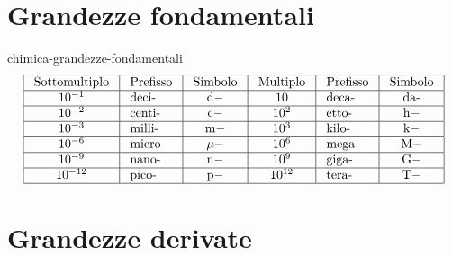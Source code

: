 \documentclass[preview]{standalone}
\begin{document}
\genpage

\section{Grandezze fondamentali}

\begin{snippet}{chimica-grandezze-fondamentali}
    \phantom{}$$
    \begin{array}{|c|l|c|c|l|c|}
    \hline \text { Sottomultiplo } & \text { Prefisso } & \text { Simbolo } & \text { Multiplo } & \text { Prefisso } & \text { Simbolo } \\
    \hline 10^{-1} & \text { deci- } & \mathrm{d}- & 10 & \text { deca- } & \text { da- } \\
    \hline 10^{-2} & \text { centi- } & \mathrm{c}- & 10^2 & \text { etto- } & \mathrm{h}- \\
    \hline 10^{-3} & \text { milli- } & \mathrm{m}- & 10^3 & \text { kilo- } & \mathrm{k}- \\
    \hline 10^{-6} & \text { micro- } & \mu- & 10^6 & \text { mega- } & \mathrm{M}- \\
    \hline 10^{-9} & \text { nano- } & \mathrm{n}- & 10^9 & \text { giga- } & \mathrm{G}- \\
    \hline 10^{-12} & \text { pico- } & \mathrm{p}- & 10^{12} & \text { tera- } & \mathrm{T}- \\
    \hline
    \end{array}
    $$
\end{snippet}

\section{Grandezze derivate}
\end{document}
